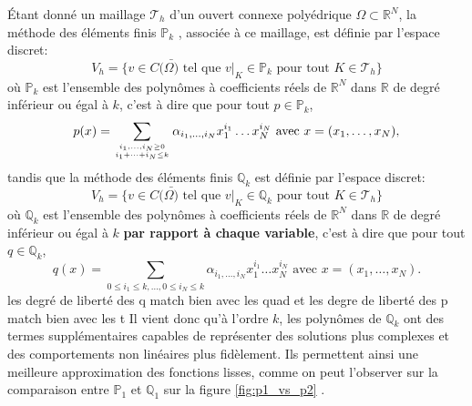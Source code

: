 \'Etant donné un maillage $\mathcal{T}_h$ d'un ouvert connexe polyédrique $\Omega\subset\mathbb{R}^N$, la méthode des éléments finis $\mathbb{P}_k$ \cite{allaire2005analyse}, associée à ce maillage, est définie par l'espace discret:
$$V_h=\{v\in C(\bar{\Omega)}\text{ tel que }v|_{K}\in\mathbb{P}_k\text{ pour tout }K\in\mathcal{T}_h\}$$
où $\mathbb{P}_k$ est l'ensemble des polynômes à coefficients réels de $\mathbb{R}^N$ dans $\mathbb{R}$ de degré inférieur ou égal à $k$, c'est à dire que pour tout $p\in\mathbb{P}_k$,
$$p(x)=\displaystyle\sum_{i_1,\dots, i_N\geq 0\atop i_1+\dots+i_N\leq k}\alpha_{i_1,\dots,i_N}x_1^{i_1}\dots x_N^{i_N}\text{ avec }x=(x_1,\dots,x_N),$$
tandis que la méthode des éléments finis $\mathbb{Q}_k$ est définie par l'espace discret:
$$V_h=\{v\in C(\bar{\Omega)}\text{ tel que }v|_{K}\in\mathbb{Q}_k\text{ pour tout }K\in\mathcal{T}_h\}$$
où $\mathbb{Q}_k$ est l'ensemble des polynômes à coefficients réels de $\mathbb{R}^N$ dans $\mathbb{R}$ de degré inférieur ou égal à $k$ \textbf{par rapport à chaque variable}, c'est à dire que pour tout $q\in\mathbb{Q}_k$,
$$q(x)=\displaystyle\sum_{0\leq i_1\leq k,\dots,0\leq i_N\leq k}\alpha_{i_1,\dots,i_N}x_1^{i_1}\dots x_N^{i_N}\text{ avec }x=(x_1,\dots,x_N).$$
\color{red}
les degré de liberté des q match bien avec les quad et les degre de liberté des p match bien avec les t
\color{black}
Il vient donc qu'à l'ordre $k$, les polynômes de $\mathbb{Q}_k$ ont des termes supplémentaires capables de représenter des solutions plus complexes et des comportements non linéaires plus fidèlement. Ils permettent ainsi une meilleure approximation des fonctions lisses, comme on peut l'observer sur la comparaison entre $\mathbb{P}_1$ et $\mathbb{Q}_1$ sur la figure \ref{fig:p1_vs_p2} \cite{reberol2018maillages}.

